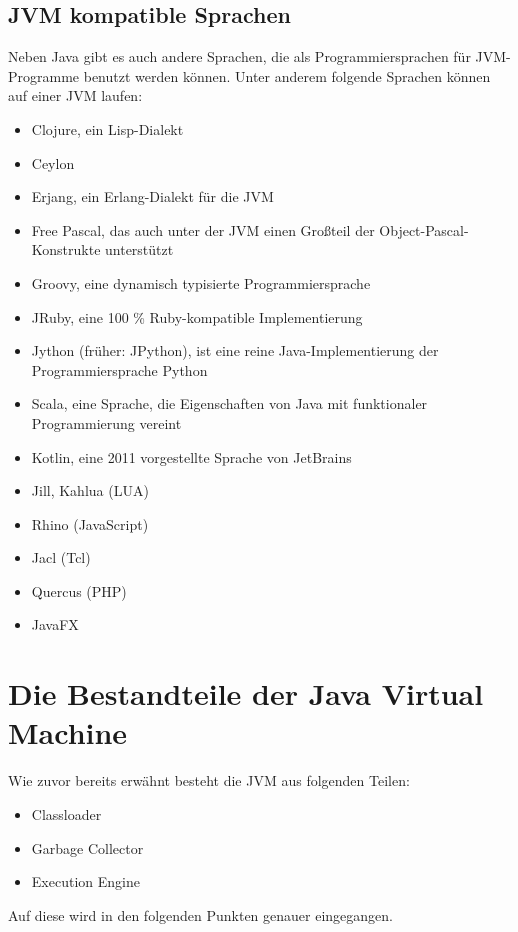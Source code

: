 \documentclass[a4paper,14pt]{scrreprt}
\begin{document}
\section{JVM kompatible Sprachen}
Neben Java gibt es auch andere Sprachen, die als Programmiersprachen für JVM-Programme benutzt werden können. Unter anderem folgende Sprachen können auf einer JVM laufen:
\begin{itemize}
\item Clojure, ein Lisp-Dialekt
\item Ceylon
\item Erjang, ein Erlang-Dialekt für die JVM
\item Free Pascal, das auch unter der JVM einen Großteil der Object-Pascal-Konstrukte unterstützt
\item Groovy, eine dynamisch typisierte Programmiersprache
\item JRuby, eine 100 \% Ruby-kompatible Implementierung
\item Jython (früher: JPython), ist eine reine Java-Implementierung der Programmiersprache Python
\item Scala, eine Sprache, die Eigenschaften von Java mit funktionaler Programmierung vereint
\item Kotlin, eine 2011 vorgestellte Sprache von JetBrains
\item Jill, Kahlua (LUA)
\item Rhino (JavaScript)
\item Jacl (Tcl)
\item Quercus (PHP)
\item JavaFX
\end{itemize}\cite{ullen2011}\cite{jvmEin}\cite{jvmEin1}

\chapter{Die Bestandteile der Java Virtual Machine}
Wie zuvor bereits erwähnt besteht die JVM aus folgenden Teilen:
\begin{itemize}
\item Classloader
\item Garbage Collector
\item Execution Engine
\end{itemize}
Auf diese wird in den folgenden Punkten genauer eingegangen.
\end{document}
